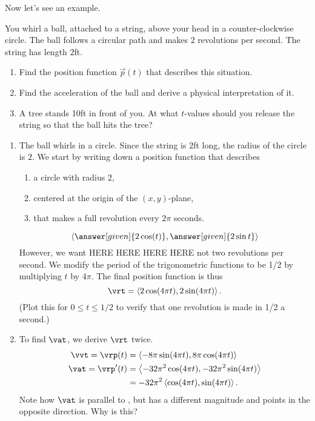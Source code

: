\documentclass{ximera}
\begin{document}
Now let's see an example.
\begin{example}
  You whirl a ball, attached to a string, above your head in a
  counter-clockwise circle. The ball follows a circular path and makes
  $2$ revolutions per second. The string has length $2$ft.
\begin{enumerate}
\item Find the position function $\vec{p}(t)$ that describes this
  situation.
\item Find the acceleration of the ball and derive a physical
  interpretation of it.
\item A tree stands 10ft in front of you. At what $t$-values should
  you release the string so that the ball hits the tree?
\end{enumerate}
\begin{explanation}
  \begin{enumerate}
  \item The ball whirls in a circle. Since the string is $2$ft long,
    the radius of the circle is $2$. We start by writing down a
    position function that describes
    \begin{enumerate}
    \item a circle with radius $2$,
    \item centered at the origin of the $(x,y)$-plane,
    \item that makes a full revolution every $2\pi$ seconds.
    \end{enumerate}
    \[
    \vector{\answer[given]{2\cos(t)}, \answer[given]{2\sin t}}
    \]
    However, we want HERE HERE HERE HERE
    not two revolutions
    per second. We modify the period of the trigonometric functions to
    be 1/2 by multiplying $t$ by $4\pi$. The final position function
    is thus $$\vrt = \vector{2\cos (4\pi t), 2\sin (4\pi t)}.$$ (Plot
    this for $0\leq t\leq 1/2$ to verify that one revolution is made
    in 1/2 a second.)
  \item To find $\vat$, we derive $\vrt$ twice.
    \begin{align*}
      \vvt = \vrp(t) &= \vector{-8\pi \sin (4\pi t), 8\pi \cos (4\pi t)}\\
      \vat =\vrp'(t) &= \vector{-32\pi^2 \cos (4\pi t), -32\pi^2 \sin (4\pi t) } \\
      &= -32\pi^2\vector{\cos (4\pi t), \sin (4\pi t)}.
    \end{align*}
    Note how $\vat$ is parallel to \vrt, but has a different magnitude
    and points in the opposite direction. Why is this?
    

\end{enumerate}
\end{explanation}
\end{example}
\end{document}
